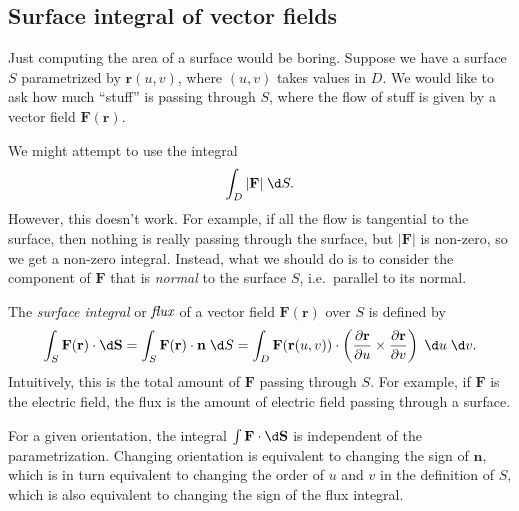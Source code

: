 \documentclass[a4paper]{article}
\begin{document}
\subsection{Surface integral of vector fields}
Just computing the area of a surface would be boring. Suppose we have a surface $S$ parametrized by $\mathbf{r}(u, v)$, where $(u, v)$ takes values in $D$. We would like to ask how much ``stuff'' is passing through $S$, where the flow of stuff is given by a vector field $\mathbf{F}(\mathbf{r})$.

We might attempt to use the integral
\[
  \int_D |\mathbf{F}| \;\d S.
\]
However, this doesn't work. For example, if all the flow is tangential to the surface, then nothing is really passing through the surface, but $|\mathbf{F}|$ is non-zero, so we get a non-zero integral. Instead, what we should do is to consider the component of $\mathbf{F}$ that is \emph{normal} to the surface $S$, i.e.\ parallel to its normal.

\begin{defi}
  The \emph{surface integral} or $\emph{flux}$ of a vector field $\mathbf{F}(\mathbf{r})$ over $S$ is defined by
  \[
    \int_S \mathbf{F}(\mathbf{r})\cdot \d \mathbf{S} = \int_S \mathbf{F}(\mathbf{r})\cdot \mathbf{n}\;\d S = \int_D \mathbf{F}(\mathbf{r}(u, v))\cdot \left(\frac{\partial \mathbf{r}}{\partial u}\times \frac{\partial \mathbf{r}}{\partial v}\right)\;\d u\;\d v.
  \]
  Intuitively, this is the total amount of $\mathbf{F}$ passing through $S$. For example, if $\mathbf{F}$ is the electric field, the flux is the amount of electric field passing through a surface.
\end{defi}

For a given orientation, the integral $\int \mathbf{F}\cdot \d \mathbf{S}$ is independent of the parametrization. Changing orientation is equivalent to changing the sign of $\mathbf{n}$, which is in turn equivalent to changing the order of $u$ and $v$ in the definition of $S$, which is also equivalent to changing the sign of the flux integral.
\end{document}
